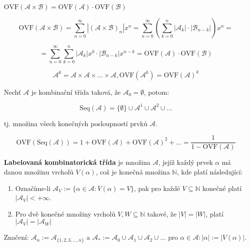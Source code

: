 \begin{pozor}
	$\text{OVF}(\mathcal{A} \times \mathcal{B}) = \text{OVF}(\mathcal{A}) \cdot \text{OVF}(\mathcal{B})$
\end{pozor}

\begin{dukaz}
	$$
	\text{OVF}(\mathcal{A} \times \mathcal{B}) = \sum_{n=0}^{\infty} |(\mathcal{A} \times \mathcal{B})_{n}|x^{n} = \sum_{n=0}^{\infty}\left(\sum_{k=0}^{n}|\mathcal{A}_{k}| \cdot |\mathcal{B}_{n-k}|\right)x^{n} =
	$$
	
	$$
	= \sum_{n=0}^{\infty} \sum_{k=0}^{n} |\mathcal{A}_{k}|x^{k} \cdot |\mathcal{B}_{n-k}|x^{n-k} = \text{OVF}(\mathcal{A}) \cdot \text{OVF}(\mathcal{B})
	$$
\end{dukaz}

\begin{pozor}
	$$
	\mathcal{A}^{k} = \mathcal{A} \times \mathcal{A} \times \dots \times \mathcal{A}, \text{OVF}(\mathcal{A}^{k}) = \text{OVF}(\mathcal{A})^{k}
	$$
\end{pozor}

\begin{definice}
	Nechť $\mathcal{A}$ je kombinační třída taková, že $\mathcal{A}_{0} = \emptyset$, potom:
	
	$$
	\text{Seq}(\mathcal{A}) = \{\emptyset\} \cup \mathcal{A}^{1} \cup \mathcal{A}^{2} \cup \dots
	$$
	
	tj. množina všech konečných posloupností prvků $\mathcal{A}$.
\end{definice}

\begin{pozor}
	$$
	\text{OVF}(\text{Seq}(\mathcal{A})) = 1 + \text{OVF}(\mathcal{A}) + \text{OVF}(\mathcal{A})^{2} + \dots = \frac{1}{1 - \text{OVF}(\mathcal{A})}
	$$
\end{pozor}

\begin{definice}
	\textbf{Labelovaná kombinatorická třída} je množina $\mathcal{A}$, jejíž každý prvek $\alpha$ má danou množinu vrcholů $V(\alpha)$, což je konečná množina $\mathbb{N}$, kde platí následující:
	
	\begin{enumerate}
		\item Označíme-li $\mathcal{A}_{V} := \{\alpha \in \mathcal{A}: V(\alpha) = V\}$, pak pro každé $V \subseteq \mathbb{N}$ konečné platí $|\mathcal{A}_{V}| < + \infty$.
		\item Pro dvě konečné množiny vrcholů $V,W \subseteq \mathbb{N}$ takové, že $|V| = |W|$, platí $|\mathcal{A}_{V}| = |\mathcal{A}_{W}|$
	\end{enumerate}
	
	Značení: $\mathcal{A}_{n} := \mathcal{A}_{\{1,2,3, \dots , n\}}$ a $\mathcal{A}_{\ast} := \mathcal{A}_{0} \cup \mathcal{A}_{1} \cup \mathcal{A}_{2} \cup \dots$ pro $\alpha \in \mathcal{A}:|\alpha| := |V(\alpha)|$.
\end{definice}

